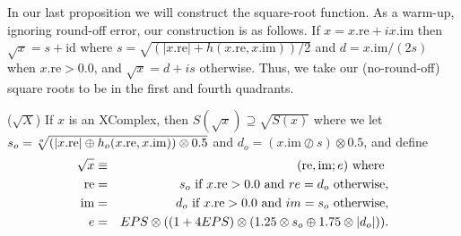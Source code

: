 In our last proposition we will construct the square-root function.  As a warm-up, ignoring round-off error, our
construction is as follows.  If $x = x.\mathrm {re} + i x.\mathrm {im}$ then $\sqrt{x} = s + \mathrm {i d}$ where $s=\sqrt{(|x.\mathrm {re}| + h(x.\mathrm {re},x.\mathrm {im}))/2}$ and $d = x.\mathrm {im}/(2s)$ when $x.\mathrm {re} > 0.0$, and $\sqrt{x} = d + i s$ otherwise.  
Thus, we take our (no-round-off) square roots to be in the first and fourth quadrants.

\begin{proposition}\label{GMT prop7.14}{($\sqrt{X}$)}
If $x$ is an {\textrm XComplex,} then $S(\sqrt{x}) \supseteq \sqrt{S(x)}$
where we
let $s_o = \root o \of {(|x.\mathrm {re}| \oplus h_o (x.\mathrm {re},x.\mathrm {im})) \otimes 0.5}$
 and $d_o = (x.\mathrm {im} \oslash s) \otimes 0.5${\textrm ,} and define
\begin{eqnarray*}
 \sqrt{x} & \equiv &(\mathrm {re},\mathrm {im};e) \hbox{ where }\\
 \mathrm {re} &=& s_o \hbox{ if $x.\mathrm {re} > 0.0$ and $re = d_o$ otherwise},\\
\mathrm {im}& =& d_o \hbox{ if $x.\mathrm {re} > 0.0$ and $im = s_o$ otherwise},
\\
e& =& EPS \otimes ((1 + 4 EPS) \otimes (1.25 \otimes s_o \oplus 1.75 \otimes |d_o|)).
\end{eqnarray*}
\end{proposition}

